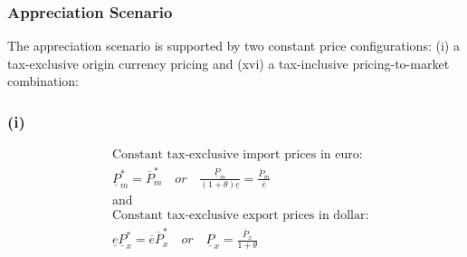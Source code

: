 \subsubsection{Appreciation Scenario}
The appreciation scenario is supported by two constant price configurations: (i) a tax-exclusive origin currency pricing and (xvi) a tax-inclusive pricing-to-market combination: 
\subsubsection*{(i)}
\begin{equation}\label{i}
\begin{aligned}
&\text{Constant tax-exclusive import prices in euro:}\\ &\underline P^*_m = \overline P^*_m \quad or \quad \frac{\underline P_m}{(1+\theta)\underline e} = \frac{\overline P_m}{\overline e} \\
&\text{and}\\
&\text{Constant tax-exclusive export prices in dollar:}\\  &\underline e \underline P^*_x = \overline e \overline P^*_x \quad or \quad \underline P_x = \frac{\overline P_x}{1+\theta}
\end{aligned}
\end{equation}

